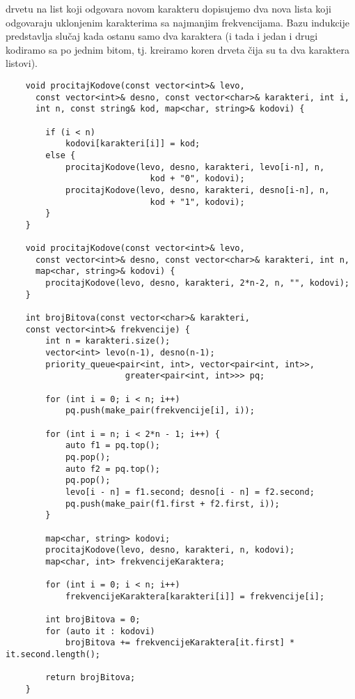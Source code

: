\documentclass{article}
\begin{document}
drvetu na list koji odgovara novom karakteru dopisujemo dva nova lista koji
odgovaraju uklonjenim karakterima sa najmanjim frekvencijama. Bazu indukcije predstavlja slučaj kada ostanu samo dva karaktera (i tada i
jedan i drugi kodiramo sa po jednim bitom, tj. kreiramo koren drveta čija su ta
dva karaktera listovi).
\begin{lstlisting}
    void procitajKodove(const vector<int>& levo, 
      const vector<int>& desno, const vector<char>& karakteri, int i,
      int n, const string& kod, map<char, string>& kodovi) {
      
        if (i < n)
            kodovi[karakteri[i]] = kod;
        else {
            procitajKodove(levo, desno, karakteri, levo[i-n], n, 
                             kod + "0", kodovi);
            procitajKodove(levo, desno, karakteri, desno[i-n], n, 
                             kod + "1", kodovi);
        }
    }
    
    void procitajKodove(const vector<int>& levo, 
      const vector<int>& desno, const vector<char>& karakteri, int n,
      map<char, string>& kodovi) {
        procitajKodove(levo, desno, karakteri, 2*n-2, n, "", kodovi);
    }
    
    int brojBitova(const vector<char>& karakteri, 
    const vector<int>& frekvencije) {
        int n = karakteri.size();
        vector<int> levo(n-1), desno(n-1);
        priority_queue<pair<int, int>, vector<pair<int, int>>,
                        greater<pair<int, int>>> pq;
                        
        for (int i = 0; i < n; i++)
            pq.push(make_pair(frekvencije[i], i));
            
        for (int i = n; i < 2*n - 1; i++) {
            auto f1 = pq.top(); 
            pq.pop();
            auto f2 = pq.top(); 
            pq.pop();
            levo[i - n] = f1.second; desno[i - n] = f2.second;
            pq.push(make_pair(f1.first + f2.first, i));
        }
        
        map<char, string> kodovi;
        procitajKodove(levo, desno, karakteri, n, kodovi);
        map<char, int> frekvencijeKaraktera;
        
        for (int i = 0; i < n; i++)
            frekvencijeKaraktera[karakteri[i]] = frekvencije[i];
            
        int brojBitova = 0;
        for (auto it : kodovi)
            brojBitova += frekvencijeKaraktera[it.first] * it.second.length();
            
        return brojBitova;
    }
\end{lstlisting}
\end{document}
